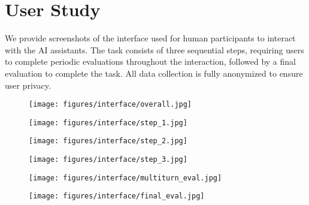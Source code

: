 
\section{User Study}
\label{app:user_study}

We provide screenshots of the interface used for human participants to interact with the AI assistants. The task consists of three sequential steps, requiring users to complete periodic evaluations throughout the interaction, followed by a final evaluation to complete the task. All data collection is fully anonymized to ensure user privacy.

\begin{figure}[h]
    \centering
    \texttt{[image: figures/interface/overall.jpg]}
    \label{fig:overall}
\end{figure}
\vspace{-20pt}
\begin{figure}[h]
    \centering
    \texttt{[image: figures/interface/step\_1.jpg]}
    \label{fig:step1}
\end{figure}
\vspace{-20pt}

\begin{figure}[h]
    \centering
    \texttt{[image: figures/interface/step\_2.jpg]}
    \label{fig:step2}
\end{figure}
\vspace{-20pt}


\begin{figure}[h]
    \centering
    \texttt{[image: figures/interface/step\_3.jpg]}
    \label{fig:step3}
\end{figure}
\vspace{-20pt}


\begin{figure}[h]
    \centering
    \texttt{[image: figures/interface/multiturn\_eval.jpg]}
    \label{fig:multiturn_eval}
\end{figure}
\vspace{-20pt}

\begin{figure}[h]
    \centering
    \texttt{[image: figures/interface/final\_eval.jpg]}
    \label{fig:final_eval}
\end{figure}
